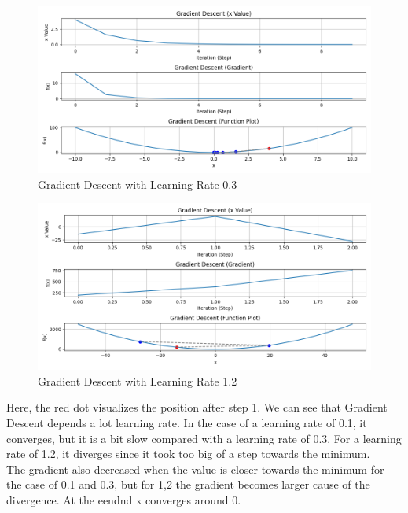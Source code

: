 \documentclass{article}
\begin{document}
\begin{figure}[ht]
  \centering
  \includegraphics[width=1\textwidth]{images/lab1/gradient_descent_lr(0.3).png}
  \caption{Gradient Descent with Learning Rate 0.3}
  \label{fig:lr_0.3}
\end{figure}

\begin{figure}[ht]
  \centering
  \includegraphics[width=1\textwidth]{images/lab1/gradient_descent_lr(1.2).png}
  \caption{Gradient Descent with Learning Rate 1.2}
  \label{fig:lr_1.2}
\end{figure}
\newpage
\noindent Here, the red dot visualizes the position after step 1. We can see that Gradient Descent depends a lot learning rate. In the case of a learning rate of 0.1, it converges, but it is a bit slow compared with a learning rate of 0.3. For a learning rate of 1.2, it diverges since it took too big of a step towards the minimum.\\
\noindent The gradient also decreased when the value is closer towards the minimum for the case of 0.1 and 0.3, but for 1,2 the gradient becomes larger cause of the divergence. At the eendnd x converges around 0.
\end{document}
